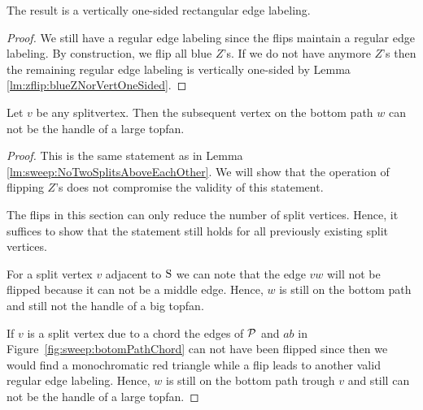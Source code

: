   \begin{lemma}
    \label{lm:sweep:vertOnsided}
    The result is a vertically one-sided rectangular edge labeling.
  \end{lemma}
  \begin{proof}
    We still have a regular edge labeling since the flips maintain a regular edge labeling.
    By construction, we flip all blue $Z$'s. If we do not have anymore $Z$'s then the remaining regular edge labeling is vertically one-sided by Lemma \ref{lm:zflip:blueZNorVertOneSided}.
  \end{proof}

  \begin{lemma}
    \label{lm:zflip:NoTwoSplitsAboveEachOtherVertOnesided}
    Let $v$ be any splitvertex. Then the subsequent vertex on the bottom path $w$ can not be the handle of a large topfan.
  \end{lemma}

  \begin{proof}
    This is the same statement as in Lemma \ref{lm:sweep:NoTwoSplitsAboveEachOther}. We will show that the operation of flipping $Z$'s does not compromise the validity of this statement.

    The flips in this section can only reduce the number of split vertices.
    Hence, it suffices to show that the statement still holds for all previously existing split vertices.

    For a split vertex $v$ adjacent to $\pS$ we can note that the edge $vw$ will not be flipped because it can not be a middle edge.
    Hence, $w$ is still on the bottom path and still not the handle of a big topfan.

    If $v$ is a split vertex due to a chord the edges of $\P$ and $ab$ in Figure~\ref{fig:sweep:botomPathChord} can not have been flipped since then we would find a monochromatic red triangle while a flip leads to another valid regular edge labeling.
    Hence, $w$ is still on the bottom path trough $v$ and still can not be the handle of a large topfan.
  \end{proof}
